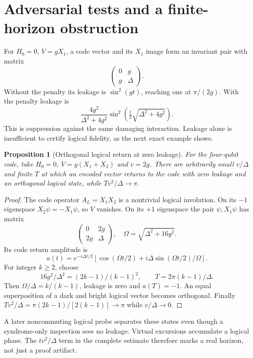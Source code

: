 \documentclass[11pt,oneside,openany]{book}
\newtheorem{proposition}[theorem]{Proposition}
\theoremstyle{definition}
\theoremstyle{remark}\newtheorem{remark}[theorem]{Remark}
\begin{document}
\section{Adversarial tests and a finite-horizon obstruction}

For $H_0=0$, $V=gX_1$, a code vector and its $X_1$ image form an invariant pair with matrix
\[
 \begin{pmatrix}0&g\\g&\Delta\end{pmatrix}.
\]
Without the penalty its leakage is $\sin^2(gt)$, reaching one at $\pi/(2g)$. With the penalty leakage is
\begin{equation}
 \frac{4g^2}{\Delta^2+4g^2}
 \sin^2\!\left(\tfrac t2\sqrt{\Delta^2+4g^2}\right).
 \label{prot:singleleak}
\end{equation}
This is suppression against the same damaging interaction. Leakage alone is insufficient to certify logical fidelity, as the next exact example shows.

\begin{proposition}[Orthogonal logical return at zero leakage]
\label{prot:horizon}
For the four-qubit code, take $H_0=0$, $V=g(X_1+X_2)$ and $v=2g$. There are arbitrarily small $v/\Delta$ and finite $T$ at which an encoded vector returns to the code with zero leakage and an orthogonal logical state, while $Tv^2/\Delta\to\pi$.
\end{proposition}
\begin{proof}
The code operator $A_L=X_1X_2$ is a nontrivial logical involution. On its $-1$ eigenspace $X_2\psi=-X_1\psi$, so $V$ vanishes. On its $+1$ eigenspace the pair $\psi,X_1\psi$ has matrix
\[
 \begin{pmatrix}0&2g\\2g&\Delta\end{pmatrix},
 \quad\Omega=\sqrt{\Delta^2+16g^2}.
\]
Its code return amplitude is
\[
 a(t)=e^{-i\Delta t/2}
 [\cos(\Omega t/2)+i\Delta\sin(\Omega t/2)/\Omega].
\]
For integer $k\ge2$, choose
\[
 16g^2/\Delta^2=(2k-1)/(k-1)^2,
 \qquad T=2\pi(k-1)/\Delta.
\]
Then $\Omega/\Delta=k/(k-1)$, leakage is zero and $a(T)=-1$. An equal superposition of a dark and bright logical vector becomes orthogonal. Finally
$Tv^2/\Delta=\pi(2k-1)/[2(k-1)]\to\pi$ while $v/\Delta\to0$.
\end{proof}

A later noncommuting logical probe separates these states even though a syndrome-only inspection sees no leakage. Virtual excursions accumulate a logical phase. The $tv^2/\Delta$ term in the complete estimate therefore marks a real horizon, not just a proof artifact.
\end{document}

